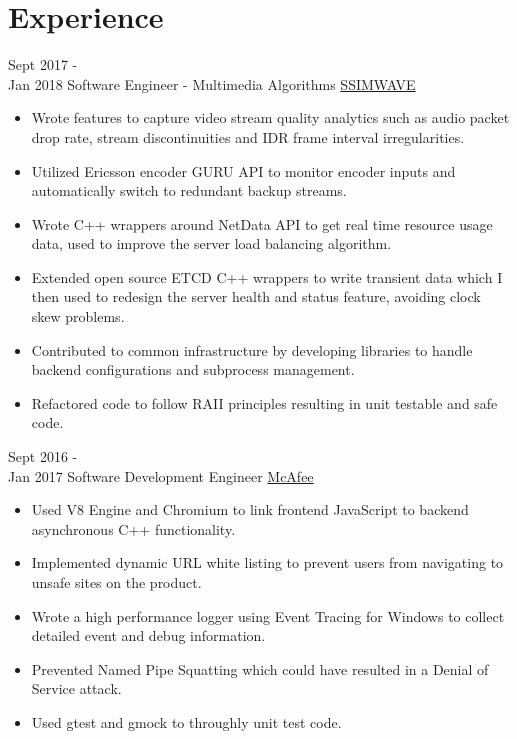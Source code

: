 \documentclass[letterpaper]{twentysecondcv} %
\begin{document}
\makeprofile %



\section{Experience}

\begin{twenty} %
		\twentyitem
    	{Sept 2017 -\\Jan 2018}
        {Software Engineer - Multimedia Algorithms}
        {\href{https://www.ssimwave.com}{SSIMWAVE}}
        {}
        {
        {\begin{itemize}
        \item Wrote features to capture video stream quality analytics such as audio packet drop rate, stream discontinuities and IDR frame interval irregularities.
        \item Utilized Ericsson encoder GURU API to monitor encoder inputs and automatically switch to redundant backup streams.
        \item Wrote C++ wrappers around NetData API to get real time resource usage data, used to improve the server load balancing algorithm.
        \item Extended open source ETCD C++ wrappers to write transient data which I then used to redesign the server health and status feature, avoiding clock skew problems.
        \item Contributed to common infrastructure by developing libraries to handle backend configurations and subprocess management.
        \item Refactored code to follow RAII principles resulting in unit testable and safe code.
    \end{itemize}}
        }

	\twentyitem
    	{Sept 2016 - \\Jan 2017}
        {Software Development Engineer}
        {\href{https://www.mcafee.com/ca/index.html}{McAfee}}
        {}
        {
        {\begin{itemize}
        \item Used V8 Engine and Chromium to link frontend JavaScript to backend asynchronous C++ functionality.
        \item Implemented dynamic URL white listing to prevent users from navigating to unsafe sites on the product.
        \item Wrote a high performance logger using Event Tracing for Windows to collect detailed event and debug information.
        \item Prevented Named Pipe Squatting which could have resulted in a Denial of Service attack.
        \item Used gtest and gmock to throughly unit test code.
    \end{itemize}}
        }
        

\end{twenty}
\end{document}
